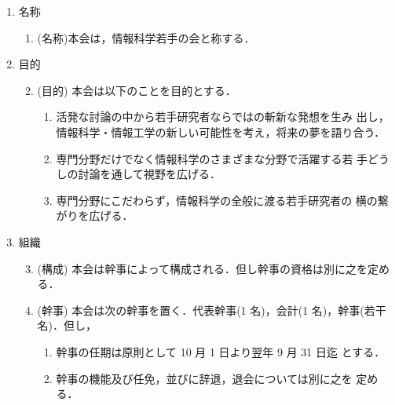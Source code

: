 \maketitle
%
\begin{enumerate}
%
\item 名称\\
%
\begin{enumerate}
\item (名称)本会は，情報科学若手の会と称する．\\
\end{enumerate}
%
\item	目的\\
%
\begin{enumerate}
\setcounter{enumii}{1}
\item \label{mokuteki} (目的) 本会は以下のことを目的とする．\\

	\begin{enumerate}
	\item	活発な討論の中から若手研究者ならではの斬新な発想を生み
出し，情報科学・情報工学の新しい可能性を考え，将来の夢を語り合う．\\
	\item	専門分野だけでなく情報科学のさまざまな分野で活躍する若
手どうしの討論を通して視野を広げる．\\
	\item	専門分野にこだわらず，情報科学の全般に渡る若手研究者の
横の繋がりを広げる．\\
	\end{enumerate}
%
\end{enumerate}
%
\item	組織\\
\begin{enumerate}
\setcounter{enumii}{2}
\item	(構成) 本会は幹事によって構成される．但し幹事の資格は別に之を定める．\\
%
\item	(幹事) 本会は次の幹事を置く．代表幹事(1 名)，会計(1 名)，幹事(若干 
名)．但し，\\
\begin{enumerate}
	\item	幹事の任期は原則として 10 月 1 日より翌年 9 月 31 日迄
とする．\\
	\item	幹事の機能及び任免，並びに辞退，退会については別に之を
定める．\\
\end{enumerate}
%


\end{enumerate}
\end{enumerate}
